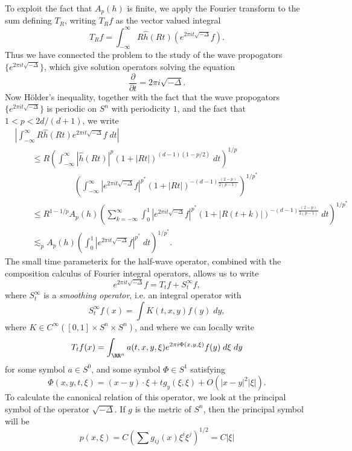 To exploit the fact that $A_p(h)$ is finite, we apply the Fourier transform to the sum defining $T_R$, writing $T_R f$ as the vector valued integral
%
\[ T_R f = \int_{-\infty}^\infty R \widehat{h}(R t) (e^{2  \pi i t \sqrt{-\Delta}} f). \]
%
Thus we have connected the problem to the study of the wave propogators $\{ e^{2 \pi i t \sqrt{-\Delta}} \}$, which give solution operators solving the equation
%
\[ \frac{\partial}{\partial t} = 2 \pi i \sqrt{-\Delta}. \]
%
Now H\"{o}lder's inequality, together with the fact that the wave propogators $\{ e^{2 \pi i t \sqrt{-\Delta}} \}$ is periodic on $S^n$ with periodicity $1$, and the fact that $1 < p < 2d/(d+1)$, we write
%
\begin{align*}
    & \left| \int_{-\infty}^\infty R \widehat{h}(Rt) e^{2 \pi i t \sqrt{-\Delta}} f\; dt \right|\\
    &\quad\quad\leq R \left( \int_{-\infty}^\infty |\widehat{h}(Rt)|^p (1 + |Rt|)^{(d-1)(1 - p/2)}\; dt \right)^{1/p}\\
    &\quad\quad\quad\quad\quad\quad\quad\left( \int_{-\infty}^\infty |e^{2 \pi i t \sqrt{-\Delta}} f|^{p^*} (1 + |Rt|)^{- (d-1)\frac{(2 - p)}{2(p-1)}} \right)^{1/p^*}\\
    &\quad\quad\leq R^{1 - 1/p} A_p(h) \left( \sum_{k = -\infty}^\infty \int_0^1 |e^{2 \pi i t \sqrt{-\Delta}} f|^{p^*} (1 + |R(t + k)|)^{- (d-1)\frac{(2 - p)}{2(p-1)}}\; dt \right)^{1/p^*}\\
    &\quad\quad\lesssim_p A_p(h) \left( \int_0^1 |e^{2 \pi i t \sqrt{-\Delta}} f|^{p^*}\; dt \right)^{1/p^*}.
\end{align*}
%
The small time parameterix for the half-wave operator, combined with the composition calculus of Fourier integral operators, allows us to write
%
\[ e^{2 \pi i t \sqrt{-\Delta}} f = T_t f + S^\infty_t f, \]
%
where $S^\infty_t$ is a \emph{smoothing operator}, i.e. an integral operator with
%
\[ S^\infty_t f(x) = \int K(t,x,y) f(y)\; dy, \]
%
where $K \in C^\infty([0,1] \times S^n \times S^n)$, and where we can locally write
%
\[ T_t f(x) = \int_{\RR^n} a(t,x,y,\xi) e^{2 \pi i \Phi(x,y,\xi)} f(y)\; d\xi\; dy \]
for some symbol $a \in S^0$, and some symbol $\Phi \in S^1$ satisfying
%
\[ \Phi(x,y,t,\xi) = (x - y) \cdot \xi + t g_y(\xi,\xi) + O(|x - y|^2 |\xi|). \]
%
To calculate the canonical relation of this operator, we look at the principal symbol of the operator $\sqrt{-\Delta}$. If $g$ is the metric of $S^n$, then the principal symbol will be
%
\[ p(x,\xi) = C \left( \sum g_{ij}(x) \xi^i \xi^j \right)^{1/2} = C |\xi| \]
%

